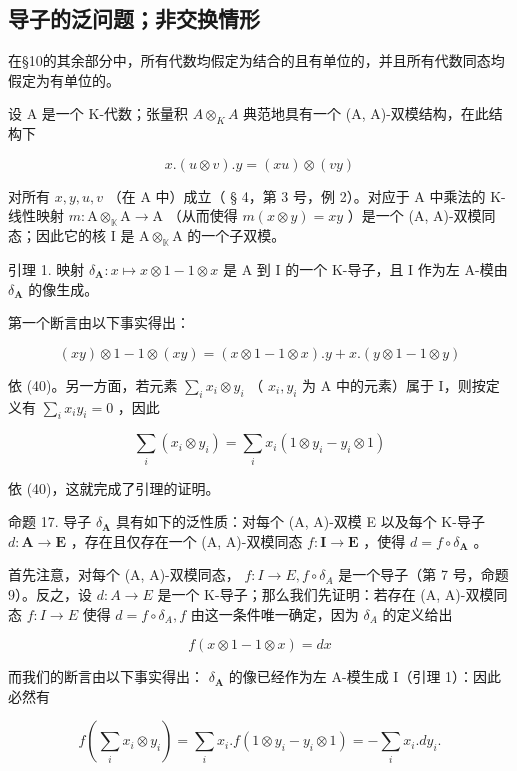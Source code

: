 \subsection{导子的泛问题；非交换情形}

在§10的其余部分中，所有代数均假定为结合的且有单位的，并且所有代数同态均假定为有单位的。

设 A 是一个 K-代数；张量积 \(A \otimes_{K} A\) 典范地具有一个 (A, A)-双模结构，在此结构下

\[
x. (u \otimes v). y = (x u) \otimes (v y)\tag{40}
\]

对所有 \(x, y, u, v\) （在 A 中）成立（ § 4，第 3 号，例 2）。对应于 A 中乘法的 K-线性映射 \(m: \mathrm{A} \otimes_{\mathbb{K}} \mathrm{A} \to \mathrm{A}\) （从而使得 \(m(x \otimes y) = xy\) ）是一个 (A, A)-双模同态；因此它的核 I 是 \(\mathrm{A} \otimes_{\mathbb{K}} \mathrm{A}\) 的一个子双模。

引理 1. 映射 \(\delta_{\mathbf{A}}: x \mapsto x \otimes 1 - 1 \otimes x\) 是 A 到 I 的一个 K-导子，且 I 作为左 A-模由 \(\delta_{\mathbf{A}}\) 的像生成。

第一个断言由以下事实得出：

\[
(x y) \otimes 1 - 1 \otimes (x y) = (x \otimes 1 - 1 \otimes x). y + x. (y \otimes 1 - 1 \otimes y)
\]

依 (40)。另一方面，若元素 \(\sum_{i} x_{i} \otimes y_{i}\) （ \(x_{i}, y_{i}\) 为 A 中的元素）属于 I，则按定义有 \(\sum_{i} x_{i} y_{i} = 0\) ，因此

\[
\sum_ {i} \left(x _ {i} \otimes y _ {i}\right) = \sum_ {i} x _ {i} (1 \otimes y _ {i} - y _ {i} \otimes 1)
\]

依 (40)，这就完成了引理的证明。

命题 17. 导子 \(\delta_{\mathbf{A}}\) 具有如下的泛性质：对每个 (A, A)-双模 E 以及每个 K-导子 \(d: \mathbf{A} \to \mathbf{E}\) ，存在且仅存在一个 (A, A)-双模同态 \(f: \mathbf{I} \to \mathbf{E}\) ，使得 \(d = f \circ \delta_{\mathbf{A}}\) 。

首先注意，对每个 (A, A)-双模同态， \(f: I \to E, f \circ \delta_{A}\) 是一个导子（第 7 号，命题 9）。反之，设 \(d: A \to E\) 是一个 K-导子；那么我们先证明：若存在 (A, A)-双模同态 \(f: I \to E\) 使得 \(d = f \circ \delta_{A}, f\) 由这一条件唯一确定，因为 \(\delta_{A}\) 的定义给出

\[
f (x \otimes 1 - 1 \otimes x) = d x
\]

而我们的断言由以下事实得出： \(\delta_{\mathbf{A}}\) 的像已经作为左 A-模生成 I（引理 1）：因此必然有

\[
f \left(\sum_ {i} x _ {i} \otimes y _ {i}\right) = \sum_ {i} x _ {i}. f (1 \otimes y _ {i} - y _ {i} \otimes 1) = - \sum_ {i} x _ {i}. d y _ {i}.
\]

